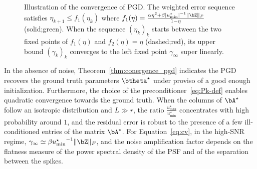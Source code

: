 \documentclass[conference,english]{IEEEtran}
\begin{document}
\begin{figure}
\center

\vspace{-24pt}
\caption{Illustration of the convergence of PGD. The weighted error sequence satisfies $\eta_{k+1} \leq f_1(\eta_k)$ where $f_1(\eta) = \frac{\alpha \eta^2 + \beta |u^\star_{\min}|^{-1}\|\bZ\|_F}{1-\eta}$ (solid;green). When the sequence $(\eta_k)_k$ starts between the two fixed points of $f_1(\eta)$ and $f_2(\eta) = \eta$ (dashed;red), its upper bound $(\gamma_k)_k$ converges to the left fixed point $\gamma_\infty$ super linearly.}
\end{figure}

In the absence of noise, Theorem~\ref{thm:conergence_pgd} indicates the PGD recovers the ground truth parameters $\btheta^\star$ under proviso of a good enough initialization. Furthermore, the choice of the preconditioner~\eqref{eq:Pk-def} enables quadratic convergence towards the ground truth.
When the columns of $\bA^\star$ follow an isotropic distribution and $L \gg r$, the ratio $\frac{u^\star_{\max}}{u^\star_{\min}}$ concentrates with high probability around $1$, and the residual error is robust to the presence of a few ill-conditioned entries of the matrix $\bA^\star$.   
For Equation~\eqref{eq:cv}, in the high-SNR regime, $\gamma_\infty \simeq \beta {u_{\min}^\star}^{-1} \| \bZ \|_F$, and the noise amplification factor depends on the flatness measure of the power spectral density of the PSF and of the separation between the spikes.
\end{document}
